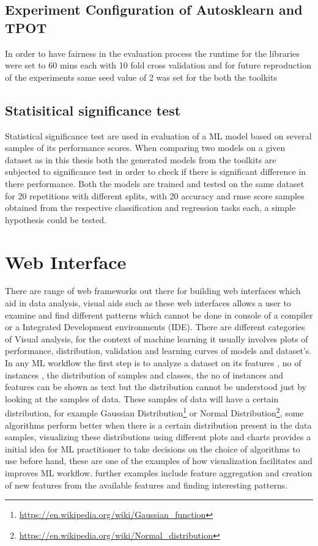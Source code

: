     
\subsection{Experiment Configuration of Autosklearn and TPOT}
In order to have fairness in the evaluation process the runtime for the libraries were set to 60 mins each with 10 fold cross validation and for future reproduction of the experiments same seed value of 2 was set for the both the toolkits
   
    
\subsection{Statisitical significance test}
Statistical significance test are used in evaluation of a ML model based on several samples of its performance scores. When comparing two models on a given dataset as in this thesis both the generated models from the toolkits are subjected to significance test in order to check if there is significant difference in there performance. Both the models are trained and tested on the same dataset for 20 repetitions with different splits, with 20 accuracy and rmse score samples obtained from the respective classification and regression tasks each, a simple hypothesis could be tested.
  
    
\section{Web Interface}
There are range of web frameworks out there for building web interfaces which aid in data analysis, visual aids such as these web interfaces allows a user to examine and find different patterns which cannot be done in console of a compiler or a Integrated Development environments (IDE). There are different categories of Visual analysis, for the context of machine learning it usually involves plots of performance, distribution, validation and learning curves of models and dataset's. In any ML workflow the first step is to analyze a dataset on its features , no of instances , the distribution of samples and classes, the no of instances and features can be shown as text but the distribution cannot be understood just by looking at the samples of data. These samples of data  will have a certain distribution, for example Gaussian Distribution\footnote{\url{https://en.wikipedia.org/wiki/Gaussian_function}} or Normal Distribution\footnote{\url{https://en.wikipedia.org/wiki/Normal_distribution}}, some algorithms perform better when there is a certain distribution present in the data samples, visualizing these distributions using different plots and charts provides a initial idea for ML practitioner to take decisions on the choice of algorithms to use before hand, these are one of the examples of how visualization facilitates and improves ML workflow. further examples include feature aggregation and creation of new features from the available features and finding interesting patterns.

